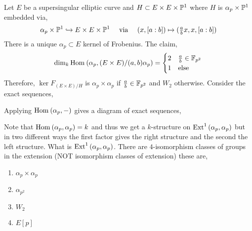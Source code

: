 \documentclass[12pt]{article}
\begin{document}
Let $E$ be a supersingular elliptic curve and $H \subset E \times E \times \P^1$ where $H$ is $\alpha_p \times \P^1$ embedded via,
\[ \alpha_p \times \P^1 \embed E \times E \times \P^1 \quad \text{ via } \quad (x, [a:b]) \mapsto (\tfrac{a}{b} x, x, [a : b]) \] 
There is a unique $\alpha_p \subset E$ kernel of Frobenius. The claim,
\[ \dim_k \Hom{}{\alpha_p}{(E \times E)/(a,b) \alpha_p} = 
\begin{cases}
2 & \frac{a}{b} \in \FF_{p^2}
\\
1 & \text{else}
\end{cases} \]
Therefore, $\ker{F_{(E \times E)/H}}$ is $\alpha_p \times \alpha_p$ if $\frac{a}{b} \in \FF_{p^2}$ and $W_2$ otherwise. Consider the exact sequences,
\begin{center}
\end{center}
Applying $\Hom{}{\alpha_p}{-}$ gives a diagram of exact sequences,
\begin{center}
\end{center}
Note that $\Hom{}{\alpha_p}{\alpha_p} = k$ and thus we get a $k$-structure on $\Ext{1}{}{\alpha_p}{\alpha_p}$ but in two different ways the first factor gives the right structure and the second the left structure. What is $\Ext{1}{}{\alpha_p}{\alpha_p}$. There are $4$-isomorphism classes of groups in the extension (NOT isomorphism classes of extension) these are,
\begin{enumerate}
\item $\alpha_p \times \alpha_p$
\item $\alpha_{p^2}$
\item $W_2$
\item $E[p]$
\end{enumerate}
\end{document}
